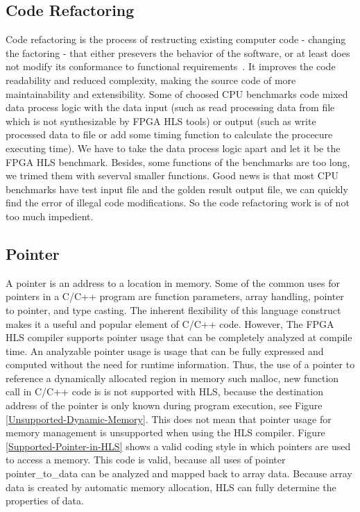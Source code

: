 \documentclass[conference]{IEEEtran}
\begin{document}
\subsection{Code Refactoring}
Code refactoring is the process of restructing existing computer code - changing the factoring - that either presevers the behavior of the software, or at least does not modify its conformance to functional requirements~\cite{fowler1999refactoring}. It improves the code readability and reduced complexity, making the source code of more maintainability and extensibility. Some of choosed CPU benchmarks code mixed data process logic with the data input (such as read processing data from file which is not synthesizable by FPGA HLS tools) or output (such as write processed data to file or add some timing function to calculate the procecure executing time). We have to take the data process logic apart and let it be the FPGA HLS benchmark. Besides, some functions of the benchmarks are too long, we trimed them with severval smaller functions. Good news is that most CPU benchmarks have test input file and the golden result output file,  we can quickly find the error of illegal code modifications. So the code refactoring work is of not too much impedient.

\subsection{Pointer}
\label{subsection-pointer}
A pointer is an address to a location in memory. Some of the common uses for pointers in a C/C++ program are function parameters, array handling, pointer to pointer, and type casting. The inherent flexibility of this language construct makes it a useful and popular element of C/C++ code. However, The FPGA HLS compiler supports pointer usage that can be completely analyzed at compile time. An analyzable pointer usage is usage that can be fully expressed and computed without the need for runtime information. Thus, the use of a pointer to reference a dynamically allocated region in memory such malloc, new function call in C/C++ code is is not supported with HLS, because the destination address of the pointer is only known during program execution, see Figure \ref{Unsupported-Dynamic-Memory}. This does not mean that pointer usage for memory management is unsupported when using the HLS compiler. Figure \ref{Supported-Pointer-in-HLS} shows a valid coding style in which pointers are used to access a memory. This code is valid, because all uses of pointer pointer\_to\_data can be analyzed and mapped back to array data. Because array data is created by automatic memory allocation, HLS can fully determine the properties of data.
\end{document}
